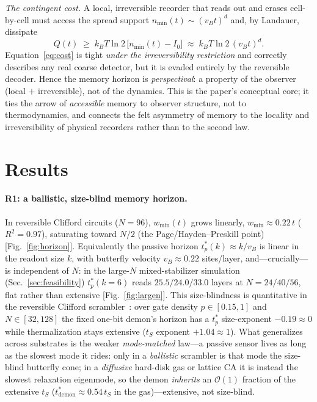 \documentclass[aps,prxquantum,twocolumn,superscriptaddress,longbibliography]{revtex4-2}
\newcommand{\vB}{v_{B}}
\begin{document}
\emph{The contingent cost.} A local, irreversible recorder that reads out and erases cell-by-cell
must access the spread support $n_{\min}(t)\sim(\vB t)^{d}$ and, by Landauer, dissipate
\begin{equation}
Q(t)\;\ge\;k_{B}T\ln 2\,\bigl[n_{\min}(t)-I_{0}\bigr]\;\approx\;k_{B}T\ln2\,(\vB t)^{d}.
\label{eq:cost}
\end{equation}
Equation~\eqref{eq:cost} is tight \emph{under the irreversibility restriction} and correctly
describes any real coarse detector, but it is evaded entirely by the reversible decoder. Hence the
memory horizon is \emph{perspectival}: a property of the observer (local $+$ irreversible), not of
the dynamics. This is the paper's conceptual core; it ties the arrow of \emph{accessible} memory to
observer structure, not to thermodynamics, and connects the felt asymmetry of memory to the
locality and irreversibility of physical recorders rather than to the second law.

\section{Results}
\label{sec:results}

\paragraph{R1: a ballistic, size-blind memory horizon.}
In reversible Clifford circuits ($N=96$), $w_{\min}(t)$ grows linearly,
$w_{\min}\approx 0.22\,t$ ($R^{2}=0.97$), saturating toward $N/2$ (the Page/Hayden--Preskill point)
[Fig.~\ref{fig:horizon}]. Equivalently the passive horizon $t^{*}_{p}(k)\approx k/\vB$ is linear in
the readout size $k$, with butterfly velocity $\vB\approx0.22$ sites/layer, and---crucially---is
independent of $N$: in the large-$N$ mixed-stabilizer simulation (Sec.~\ref{sec:feasibility})
$t^{*}_{p}(k{=}6)$ reads $25.5/24.0/33.0$ layers at $N=24/40/56$, flat rather than extensive
[Fig.~\ref{fig:largen}]. This size-blindness is quantitative in the reversible Clifford
scrambler~\cite{arrowrepo}: over gate density $p\in[0.15,1]$ and $N\in[32,128]$ the fixed one-bit
demon's horizon has a $t^{*}_{p}$ size-exponent $-0.19\approx0$ while thermalization stays extensive
($t_{S}$ exponent $+1.04\approx1$). What generalizes across substrates is the weaker
\emph{mode-matched} law---a passive sensor lives as long as the slowest mode it rides: only in a
\emph{ballistic} scrambler is that mode the size-blind butterfly cone; in a \emph{diffusive}
hard-disk gas or lattice CA it is instead the slowest relaxation eigenmode, so the demon
\emph{inherits} an $\mathcal{O}(1)$ fraction of the extensive $t_{S}$
($t^{*}_{\mathrm{demon}}\approx0.54\,t_{S}$ in the gas)---extensive, not size-blind.
\end{document}
